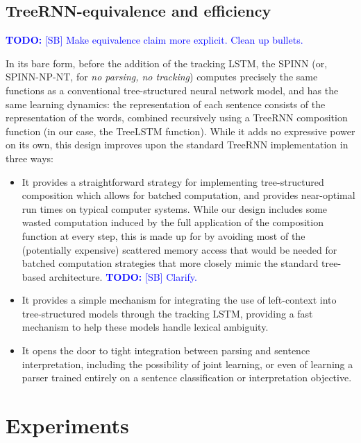 \documentclass[11pt]{article}
\newcommand\todo[1]{\textcolor{blue}{\textbf{TODO:} #1}}
\begin{document}
\subsection{TreeRNN-equivalence and efficiency}

\todo{[SB] Make equivalence claim more explicit. Clean up bullets.}

In its bare form, before the addition of the tracking LSTM, the SPINN (or, SPINN-NP-NT, for \textit{no parsing, no tracking}) computes precisely the same functions as a conventional tree-structured neural network model, and has the same learning dynamics: the representation of each sentence consists of the representation of the words, combined recursively using a TreeRNN composition function (in our case, the TreeLSTM function). While it adds no expressive power on its own, this design improves upon the standard TreeRNN implementation in three ways:

\begin{itemize}
\item It provides a straightforward strategy for implementing tree-structured composition which allows for batched computation, and provides near-optimal run times on typical computer systems. While our design includes some wasted computation induced by the full application of the composition function at every step, this is made up for by avoiding most of the (potentially expensive) scattered memory access that would be needed for batched computation strategies that more closely mimic the standard tree-based architecture. \todo{[SB] Clarify.}

\item It provides a simple mechanism for integrating the use of left-context into tree-structured models through the tracking LSTM, providing a fast mechanism to help these models handle lexical ambiguity.

\item It opens the door to tight integration between parsing and sentence interpretation, including the possibility of joint learning, or even of learning a parser trained entirely on a sentence classification or interpretation objective.
\end{itemize}

\section{Experiments}
\end{document}
